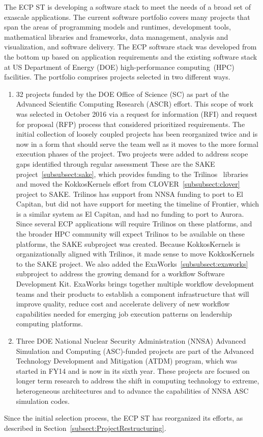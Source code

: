 The ECP ST is developing a software stack to meet the needs of a broad set of exascale applications. The current software portfolio covers many projects that span the areas of programming models and runtimes, development tools, mathematical libraries and frameworks, data management, analysis and visualization, and software delivery. The ECP software stack was developed from the bottom up based on application requirements and the existing software stack at US Department of Energy (DOE) high-performance computing~(HPC) facilities. The portfolio comprises projects selected in two different ways.
\begin{enumerate}
\item 32 projects funded by the DOE Office of Science (SC) as part of the Advanced Scientific Computing Research (ASCR) effort.  This scope of work was selected in October 2016 via a request for information (RFI) and request for proposal (RFP) process that considered prioritized requirements. The initial collection of loosely coupled projects has been reorganized twice and is now in a form that should serve the team well as it moves to the more formal execution phases of the project. Two projects were added to address scope gaps identified through regular assessment These are the SAKE project~\ref{subsubsect:sake}, which provides funding to the Trilinos~\cite{trilinos:homepage} libraries and moved the KokkosKernels effort from CLOVER~\ref{subsubsect:clover} project to SAKE.  Trilinos has support from NNSA funding to port to El Capitan, but did not have support for meeting the timeline of Frontier, which is a similar system as El Capitan, and had no funding to port to Aurora.  Since several ECP applications will require Trilinos on these platforms, and the broader HPC community will expect Trilinos to be available on these platforms, the SAKE subproject was created.  Because KokkosKernels is organizationally aligned with Trilinos, it made sense to move KokkosKernels to the SAKE project.  We also added the ExaWorks~\ref{subsubsect:exaworks} subproject to address the growing demand for a workflow Software Development Kit.  ExaWorks brings together multiple workflow development teams and their products to establish a component infrastructure that will improve quality, reduce cost and accelerate delivery of new workflow capabilities needed for emerging job execution patterns on leadership computing platforms.
\item Three DOE National Nuclear Security Administration (NNSA) Advanced Simulation and Computing (ASC)-funded projects are part of the Advanced Technology Development and Mitigation (ATDM) program, which was started in FY14 and is now in its sixth year. These projects are focused on longer term research to address the shift in computing technology to extreme, heterogeneous architectures and to advance the capabilities of NNSA ASC simulation codes. 
\end{enumerate}
Since the initial selection process, the ECP ST has reorganized its efforts, as described in Section~\ref{subsect:ProjectRestructuring}.

